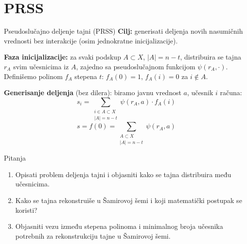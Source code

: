 \documentclass[aspectratio=1610]{beamer}
\begin{document}
 
 \section{PRSS}
 
\begin{frame}{Pseudoslučajno deljenje tajni (PRSS)}
\sloppy
\textbf{Cilj:} generisati deljenja novih nasumičnih vrednosti bez interakcije
(osim jednokratne inicijalizacije).
 
\vspace{0.8em}
\textbf{Faza inicijalizacije:} za svaki podskup $A \subset X$, $|A| = n-t$,
distribuira se tajna $r_A$ svim učesnicima iz $A$, zajedno sa
pseudoslučajnom funkcijom $\psi(r_A, \cdot)$.
Definišemo polinom $f_A$ stepena $t$: $f_A(0)=1$, $f_A(i)=0$ za $i \notin A$.
 
\vspace{0.8em}
\textbf{Generisanje deljenja} (bez dilera): biramo javnu vrednost $a$,
učesnik $i$ računa:
\[s_i = \sum_{\substack{i \in A \subset X \\ |A|=n-t}} \psi(r_A, a) \cdot f_A(i)\]
\[s = f(0) = \sum_{\substack{A \subset X \\ |A|=n-t}} \psi(r_A, a)\]
\end{frame}

\begin{frame}{Pitanja}
\begin{enumerate}
\setlength\itemsep{0.6em}
\item Opisati problem deljenja tajni i objasniti kako se tajna distribuira među učesnicima.
 
\item Kako se tajna rekonstruiše u Šamirovoj šemi i koji matematički postupak se koristi?
 
\item Objasniti vezu između stepena polinoma i minimalnog broja učesnika potrebnih za rekonstrukciju tajne u Šamirovoj šemi.
\end{enumerate}
\end{frame}
\end{document}
